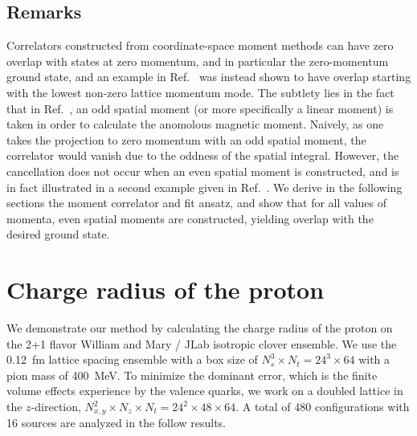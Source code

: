 \documentclass{PoS}
\begin{document}
\subsection{Remarks}
Correlators constructed from coordinate-space moment methods can have zero overlap with states at zero momentum, and in particular the zero-momentum ground state, and an example in  Ref.~\cite{Wilcox:2002zt} was instead shown to have overlap starting with the lowest non-zero lattice momentum mode. The subtlety lies in the fact that in Ref.~\cite{Wilcox:2002zt}, an odd spatial moment (or more specifically a linear moment) is taken in order to calculate the anomolous magnetic moment. Naively, as one takes the projection to zero momentum with an odd spatial moment, the correlator would vanish due to the oddness of the spatial integral.  However, the cancellation does not occur when an even spatial moment is constructed, and is in fact illustrated in a second example given in Ref.~\cite{Wilcox:2002zt}. We derive in the following sections the moment correlator and fit ansatz, and show that for all values of momenta, even spatial moments are constructed, yielding overlap with the desired ground state.

\section{Charge radius of the proton}
We demonstrate our method by calculating the charge radius of the proton on the 2+1 flavor William and Mary / JLab isotropic clover ensemble.  We use the 0.12~fm lattice spacing ensemble with a box size of $N_s^3\times N_t = 24^3\times 64$ with a pion mass of 400~MeV. To minimize the dominant error, which is the finite volume effects experience by the valence quarks, we work on a doubled lattice in the $z$-direction,  $N_{x,y}^2 \times N_z \times N_t = 24^2\times 48\times 64$.  A total of 480 configurations with 16 sources are analyzed in the follow results.
\end{document}
